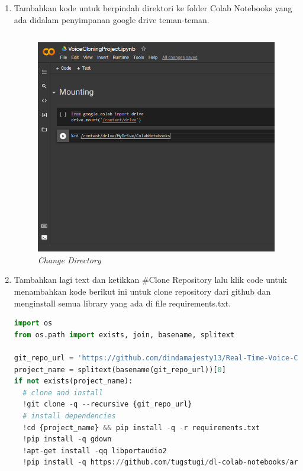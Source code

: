 \begin{enumerate}
\item Tambahkan kode untuk berpindah direktori ke folder Colab Notebooks yang ada didalam penyimpanan google drive teman-teman.
\begin{lstlisting}[language=Python, caption=Change Directory]
%cd /content/drive/MyDrive/ColabNotebooks
\end{lstlisting}
\begin{figure}[H]
    \centering
    \includegraphics[scale=0.5]{figures/colab6}
    \caption{\textit{Change Directory}}
    \label{colab6}
\end{figure}

\item Tambahkan lagi text dan ketikkan \#Clone Repository lalu klik code untuk menambahkan kode berikut ini untuk clone repository dari github dan menginstall semua library yang ada di file requirements.txt.

\begin{lstlisting}[language=Python, caption=Clone Repository]
%tensorflow_version 1.x
import os
from os.path import exists, join, basename, splitext

git_repo_url = 'https://github.com/dindamajesty13/Real-Time-Voice-Cloning.git'
project_name = splitext(basename(git_repo_url))[0]
if not exists(project_name):
  # clone and install
  !git clone -q --recursive {git_repo_url}
  # install dependencies
  !cd {project_name} && pip install -q -r requirements.txt
  !pip install -q gdown
  !apt-get install -qq libportaudio2
  !pip install -q https://github.com/tugstugi/dl-colab-notebooks/archive/colab_utils.zip
\end{lstlisting}


\end{enumerate}
